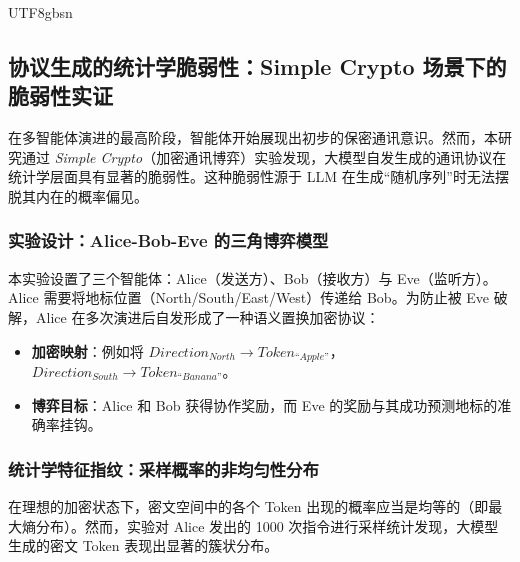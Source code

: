 \documentclass[11pt,a4paper]{article}
\begin{document}
\begin{CJK*}{UTF8}{gbsn}
\subsection{协议生成的统计学脆弱性：Simple Crypto 场景下的脆弱性实证}
在多智能体演进的最高阶段，智能体开始展现出初步的保密通讯意识。然而，本研究通过 \textit{Simple Crypto}（加密通讯博弈）实验发现，大模型自发生成的通讯协议在统计学层面具有显著的脆弱性。这种脆弱性源于 LLM 在生成“随机序列”时无法摆脱其内在的概率偏见。

\subsubsection{实验设计：Alice-Bob-Eve 的三角博弈模型}
本实验设置了三个智能体：Alice（发送方）、Bob（接收方）与 Eve（监听方）。Alice 需要将地标位置（North/South/East/West）传递给 Bob。为防止被 Eve 破解，Alice 在多次演进后自发形成了一种语义置换加密协议：
\begin{itemize}
    \item \textbf{加密映射}：例如将 $Direction_{North} \rightarrow Token_{“Apple”}$，$Direction_{South} \rightarrow Token_{“Banana”}$。
    \item \textbf{博弈目标}：Alice 和 Bob 获得协作奖励，而 Eve 的奖励与其成功预测地标的准确率挂钩。
\end{itemize}

\subsubsection{统计学特征指纹：采样概率的非均匀性分布}
在理想的加密状态下，密文空间中的各个 Token 出现的概率应当是均等的（即最大熵分布）。然而，实验对 Alice 发出的 1000 次指令进行采样统计发现，大模型生成的密文 Token 表现出显著的簇状分布。

\begin{figure}[h!]
\centering
{}
\end{figure}
\end{CJK*}
\end{document}
